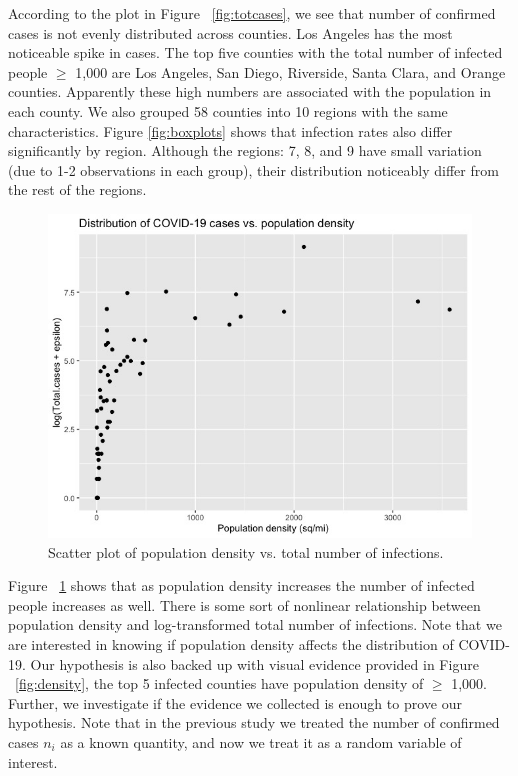 \documentclass[11pt,twocolumn]{asaproc}
\begin{document}
According to the plot in Figure ~\ref{fig:totcases}, we see that number of confirmed cases is not evenly distributed across counties. Los Angeles has the most noticeable spike in cases. The top five counties with the total number of infected people $\geq$ 1,000 are Los Angeles, San Diego, Riverside, Santa Clara, and Orange counties. Apparently these high numbers are associated with the population in each county. We also grouped 58 counties into 10 regions with the same characteristics. Figure \ref{fig:boxplots} shows that infection rates also differ significantly by region. Although the regions: 7, 8, and 9 have small variation (due to 1-2 observations in each group), their distribution noticeably differ from the rest of the regions.

\begin{figure}[t]
\centering\includegraphics[scale=.31]{density_vs_totcases.jpeg}
\caption{Scatter plot of population density vs. total number of infections.}
\label{fig:densvstotcases}
\end{figure}

Figure ~\ref{fig:densvstotcases} shows that as population density increases the number of infected people increases as well. There is some sort of nonlinear relationship between population density and log-transformed total number of infections. Note that we are interested in knowing if population density affects the distribution of COVID-19. Our hypothesis is also backed up with visual evidence provided in Figure ~\ref{fig:density}, the top 5 infected counties have population density of $\geq$ 1,000. Further, we investigate if the evidence we collected is enough to prove our hypothesis. Note that in the previous study we treated the number of confirmed cases $n_i$ as a known quantity, and now we treat it as a random variable of interest. 
\end{document}
